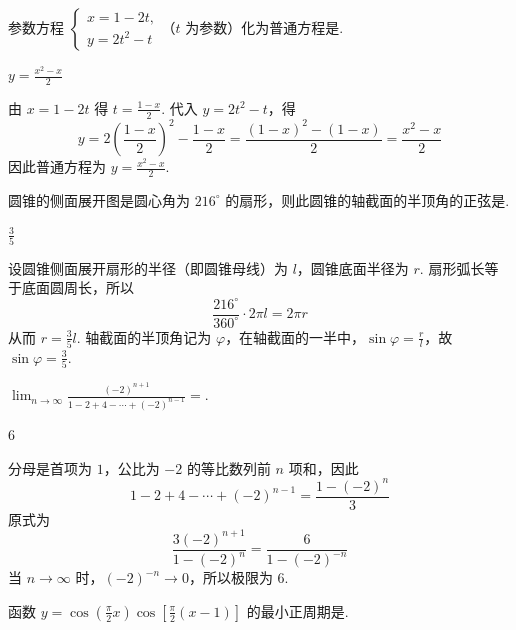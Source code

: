 \begin{problem}
参数方程 \(\begin{cases}
x=1-2t,\\
y=2t^2-t
\end{cases}\)（\(t\) 为参数）化为普通方程是\fillinblank{}.
\end{problem}

\begin{answer}
\(y=\frac{x^2-x}{2}\)
\end{answer}

\begin{solution}
由 \(x=1-2t\) 得 \(t=\frac{1-x}{2}\). 代入 \(y=2t^2-t\)，得
\[
y=2\left(\frac{1-x}{2}\right)^2-\frac{1-x}{2}=\frac{(1-x)^2-(1-x)}2=\frac{x^2-x}{2}
\]
因此普通方程为 \(y=\frac{x^2-x}{2}\).
\end{solution}

\begin{problem}
圆锥的侧面展开图是圆心角为 \(216^\circ\) 的扇形，则此圆锥的轴截面的半顶角的正弦是\fillinblank{}.
\end{problem}

\begin{answer}
\(\frac{3}{5}\)
\end{answer}

\begin{solution}
设圆锥侧面展开扇形的半径（即圆锥母线）为 \(l\)，圆锥底面半径为 \(r\). 扇形弧长等于底面圆周长，所以
\[
\frac{216^\circ}{360^\circ}\cdot2\pi l=2\pi r
\]
从而 \(r=\frac35l\). 轴截面的半顶角记为 \(\varphi\)，在轴截面的一半中，\(\sin\varphi=\frac rl\)，故 \(\sin\varphi=\frac35\).
\end{solution}

\begin{problem}
\(\displaystyle\lim_{n\to\infty}\frac{(-2)^{n+1}}{1-2+4-\cdots+(-2)^{n-1}}=\)\fillinblank{}.
\end{problem}

\begin{answer}
\(6\)
\end{answer}

\begin{solution}
分母是首项为 \(1\)，公比为 \(-2\) 的等比数列前 \(n\) 项和，因此
\[
1-2+4-\cdots+(-2)^{n-1}=\frac{1-(-2)^n}{3}
\]
原式为
\[
\frac{3(-2)^{n+1}}{1-(-2)^n}=\frac{6}{1-(-2)^{-n}}
\]
当 \(n\to\infty\) 时，\((-2)^{-n}\to0\)，所以极限为 \(6\).
\end{solution}

\begin{problem}
函数 \(y=\cos\left( \frac{\pi}{2}x \right)\cos\left[ \frac{\pi}{2}(x-1) \right]\) 的最小正周期是\fillinblank{}.
\end{problem}

